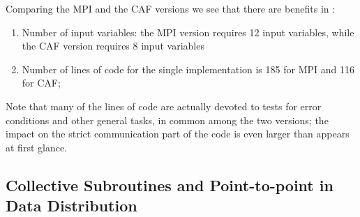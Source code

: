 \documentclass{IOS-Book-Article}
\begin{document}
Comparing the  MPI and the CAF versions we see that there are benefits
in : 
\begin{enumerate}
\item Number of input variables: the MPI version requires 12 input
  variables, while the CAF version requires 8 input variables 
\item Number of lines of code for the single implementation is 185 for
  MPI and 116 for CAF;  
\end{enumerate}
Note that many of the lines of code are actually devoted to  tests for error
conditions and other general tasks,  in common among the two versions;
the impact on the strict communication part of the code is even larger
than appears at first glance. 
  
\subsection{Collective Subroutines and Point-to-point in Data Distribution}
\end{document}
